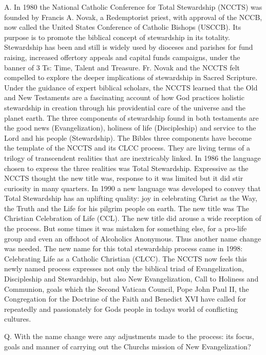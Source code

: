 \documentclass[oneside]{book}
\begin{document}
A. In 1980 the National Catholic Conference for Total Stewardship (NCCTS) was
founded by Francis A. Novak, a Redemptorist priest, with approval of the NCCB,
now called the United States Conference of Catholic Bishops (USCCB). Its purpose
is to promote the biblical concept of stewardship in its totality. Stewardship
has been and still is widely used by dioceses and parishes for fund raising,
increased offertory appeals and capital funds campaigns, under the banner of 3
Ts: Time, Talent and Treasure.  Fr. Novak and the NCCTS felt compelled to
explore the deeper implications of stewardship in Sacred Scripture. Under the
guidance of expert biblical scholars, the NCCTS learned that the Old and New
Testaments are a fascinating account of how God practices holistic stewardship
in creation through his providential care of the universe and the planet
earth. The three components of stewardship found in both testaments are the good
news (Evangelization), holiness of life (Discipleship) and service to the Lord
and his people (Stewardship). The Bibles three components have become the
template of the NCCTS and its CLCC process. They are living terms of a trilogy
of transcendent realities that are inextricably linked. In 1986 the language
chosen to express the three realities was Total Stewardship.  Expressive as the
NCCTS thought the new title was, response to it was limited but it did stir
curiosity in many quarters. In 1990 a new language was developed to convey that
Total Stewardship has an uplifting quality: joy in celebrating Christ as the
Way, the Truth and the Life for his pilgrim people on earth. The new title was
The Christian Celebration of Life (CCL). The new title did arouse a wide
reception of the process. But some times it was mistaken for something else, for
a pro-life group and even an offshoot of Alcoholics Anonymous. Thus another name
change was needed.  The new name for this total stewardship process came in
1998: Celebrating Life as a Catholic Christian (CLCC). The NCCTS now feels this
newly named process expresses not only the biblical triad of Evangelization,
Discipleship and Stewardship, but also New Evangelization, Call to Holiness and
Communion, goals which the Second Vatican Council, Pope John Paul II, the
Congregation for the Doctrine of the Faith and Benedict XVI have called for
repeatedly and passionately for Gods people in todays world of conflicting
cultures.


Q. With the name change were any adjustments made to the process: its focus,
goals and manner of carrying out the Churchs mission of New Evangelization?
\end{document}
